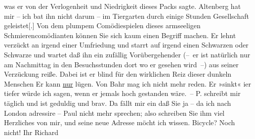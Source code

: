 \begin{ledgroupsized}[t]{13cm}
               was er von der Verlogenheit und Niedrigkeit dieses Packs sagte.\pend
           \pstart
           Altenberg hat mir – ich bat ihn nicht darum –
                  {\pb}im Tiergarten durch einige Stunden Gesellschaft
                  geleistet{[}.{]} Von dem plumpem Comödiespielen dieses armseeligen
               Schmierencomödianten können Sie sich kaum einen Begriff machen. {\pb}Er lehnt verzückt an irgend einer
               Umfriedung und starrt auf irgend einen Schwarzen oder Schwarze und wartet daß ihn ein
               zufällig Vorübergehender (– er ist natürlich nur am Nachmittag in den Besuchsstunden
               dort wo er gesehen wird –) {\pb}aus
               seiner Verzückung reiße. Dabei ist er blind für den wirklichen Reiz dieser dunkeln
               Menschen\pend
           \pstart
           Er kann \uline{nur} lügen.\pend
           \pstart
           Von Bahr mag ich {\pb}nicht mehr reden. Er »sinkt« i{\geminationm}er tiefer würde ich sagen, wenn er jemals hoch
               gestanden wäre. –\pend
           \pstart
           P. schreibt mir täglich und ist geduldig und
               brav. Da fällt {\pb}mir ein daß Sie ja
               – da ich nach London adressire – Paul nicht mehr sprechen; also schreiben Sie
               ihm viel Herzliches von mir, und seine neue Adresse möcht ich wissen. Bicycle? Noch
               nicht!\pend
           \pstart Ihr \spacefill\mbox{Richard}\pend{}
         
         \endnumbering{}\end{ledgroupsized}  \newcommand{\dateiname}{L00680}\newcommand{\titel}{Richard Beer-Hofmann an Arthur Schnitzler, 20. 5. 1897}\newcommand{\editorInnen}{ Martin Anton Müller und Gerd-Hermann Susen}
      